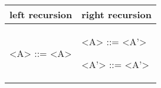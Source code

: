\begin{center}
	\begin{tabular}{p{7cm} | p{7cm}}
		left recursion
		&
		right recursion
		\\
		\hline
		
		\begin{grammarEx}
			<A> ::= <A> \textcolor{red}{\textalpha}
			\alt \textcolor{blue}{\textbeta}
		\end{grammarEx}
		
		&
		
		\begin{grammarEx}
			<A> ::= \textcolor{blue}{\textbeta} <A'>
			
			<A'> ::= \textcolor{red}{\textalpha} <A'>
			\alt \textemptyword
		\end{grammarEx}
		
	\end{tabular}
\end{center}